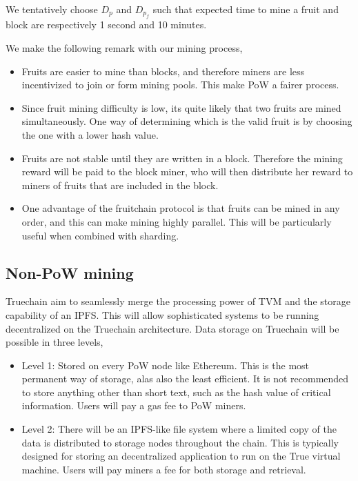 \documentclass[9pt,oneside]{amsart}
\begin{document}
\begin{multicols}{2}
We tentatively choose $D_p$ and $D_{p_f}$ such that expected time to mine a fruit and block are respectively 1 second and 10 minutes. 

We make the following remark with our mining process, 
\begin{itemize}
	\item Fruits are easier to mine than blocks, and therefore miners are less incentivized to join or form mining pools. This make PoW a fairer process. 
	
	\item Since fruit mining difficulty is low, its quite likely that two fruits are mined simultaneously. One way of determining which is the valid fruit is by choosing the one with a lower hash value. 
	
	\item Fruits are not stable until they are written in a block. Therefore the mining reward will be paid to the block miner, who will then distribute her reward to miners of fruits that are included in the block. 
	
	\item One advantage of the fruitchain protocol is that fruits can be mined in any order, and this can make mining highly parallel. This will be particularly useful when combined with sharding. 
\end{itemize}


\subsection{Non-PoW mining}

Truechain aim to seamlessly merge the processing power of TVM and the storage capability of an IPFS. This will allow sophisticated systems to be running decentralized on the Truechain architecture. Data storage on Truechain will be possible in three levels, 

\begin{itemize}
	\item Level 1: Stored on every PoW node like Ethereum. This is the most permanent way of storage, alas also the least efficient. It is not recommended to store anything other than short text, such as the hash value of critical information. Users will pay a gas fee to PoW miners. 
	
	\item Level 2: There will be an IPFS-like file system where a limited copy of the data is distributed to storage nodes throughout the chain. This is typically designed for storing an decentralized application to run on the True virtual machine. Users will pay miners a fee for both storage and retrieval.
	

\end{itemize}
\end{multicols}
\end{document}

